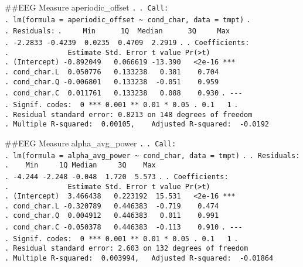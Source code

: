 \documentclass[
]{article}
\begin{document}
\#\#EEG Measure aperiodic\_offset \texttt{.} \texttt{.\ Call:}
\texttt{.\ lm(formula\ =\ aperiodic\_offset\ \textasciitilde{}\ cond\_char,\ data\ =\ tmpt)}
\texttt{.} \texttt{.\ Residuals:}
\texttt{.\ \ \ \ \ Min\ \ \ \ \ \ 1Q\ \ Median\ \ \ \ \ \ 3Q\ \ \ \ \ Max}
\texttt{.\ -2.2833\ -0.4239\ \ 0.0235\ \ 0.4709\ \ 2.2919} \texttt{.}
\texttt{.\ Coefficients:}
\texttt{.\ \ \ \ \ \ \ \ \ \ \ \ \ \ Estimate\ Std.\ Error\ t\ value\ Pr(\textgreater{}\textbar{}t\textbar{})}
\texttt{.\ (Intercept)\ -0.892049\ \ \ 0.066619\ -13.390\ \ \ \textless{}2e-16\ ***}
\texttt{.\ cond\_char.L\ \ 0.050776\ \ \ 0.133238\ \ \ 0.381\ \ \ \ 0.704}
\texttt{.\ cond\_char.Q\ -0.006801\ \ \ 0.133238\ \ -0.051\ \ \ \ 0.959}
\texttt{.\ cond\_char.C\ \ 0.011761\ \ \ 0.133238\ \ \ 0.088\ \ \ \ 0.930}
\texttt{.\ -\/-\/-}
\texttt{.\ Signif.\ codes:\ \ 0\ \textquotesingle{}***\textquotesingle{}\ 0.001\ \textquotesingle{}**\textquotesingle{}\ 0.01\ \textquotesingle{}*\textquotesingle{}\ 0.05\ \textquotesingle{}.\textquotesingle{}\ 0.1\ \textquotesingle{}\ \textquotesingle{}\ 1}
\texttt{.}
\texttt{.\ Residual\ standard\ error:\ 0.8213\ on\ 148\ degrees\ of\ freedom}
\texttt{.\ Multiple\ R-squared:\ \ 0.00105,\ \ \ \ Adjusted\ R-squared:\ \ -0.0192}

\#\#EEG Measure alpha\_avg\_power \texttt{.} \texttt{.\ Call:}
\texttt{.\ lm(formula\ =\ alpha\_avg\_power\ \textasciitilde{}\ cond\_char,\ data\ =\ tmpt)}
\texttt{.} \texttt{.\ Residuals:}
\texttt{.\ \ \ \ Min\ \ \ \ \ 1Q\ Median\ \ \ \ \ 3Q\ \ \ \ Max}
\texttt{.\ -4.244\ -2.248\ -0.048\ \ 1.720\ \ 5.573} \texttt{.}
\texttt{.\ Coefficients:}
\texttt{.\ \ \ \ \ \ \ \ \ \ \ \ \ \ Estimate\ Std.\ Error\ t\ value\ Pr(\textgreater{}\textbar{}t\textbar{})}
\texttt{.\ (Intercept)\ \ 3.466438\ \ \ 0.223192\ \ 15.531\ \ \ \textless{}2e-16\ ***}
\texttt{.\ cond\_char.L\ -0.320789\ \ \ 0.446383\ \ -0.719\ \ \ \ 0.474}
\texttt{.\ cond\_char.Q\ \ 0.004912\ \ \ 0.446383\ \ \ 0.011\ \ \ \ 0.991}
\texttt{.\ cond\_char.C\ -0.050378\ \ \ 0.446383\ \ -0.113\ \ \ \ 0.910}
\texttt{.\ -\/-\/-}
\texttt{.\ Signif.\ codes:\ \ 0\ \textquotesingle{}***\textquotesingle{}\ 0.001\ \textquotesingle{}**\textquotesingle{}\ 0.01\ \textquotesingle{}*\textquotesingle{}\ 0.05\ \textquotesingle{}.\textquotesingle{}\ 0.1\ \textquotesingle{}\ \textquotesingle{}\ 1}
\texttt{.}
\texttt{.\ Residual\ standard\ error:\ 2.603\ on\ 132\ degrees\ of\ freedom}
\texttt{.\ Multiple\ R-squared:\ \ 0.003994,\ \ \ Adjusted\ R-squared:\ \ -0.01864}
\end{document}
